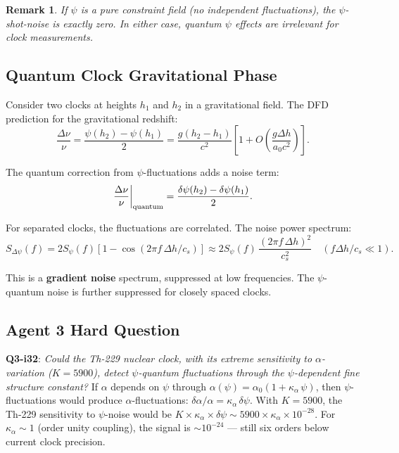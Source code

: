 \documentclass[11pt,a4paper]{article}
\newtheorem{remark}{Remark}
\begin{document}
\begin{remark}
If $\psi$ is a pure constraint field (no independent fluctuations), the $\psi$-shot-noise is exactly zero. In either case, quantum $\psi$ effects are irrelevant for clock measurements.
\end{remark}

\subsection{Quantum Clock Gravitational Phase}
\label{sec:clock-phase}

Consider two clocks at heights $h_1$ and $h_2$ in a gravitational field. The DFD prediction for the gravitational redshift:
\begin{equation}
\frac{\Delta\nu}{\nu} = \frac{\psi(h_2) - \psi(h_1)}{2} = \frac{g(h_2-h_1)}{c^2}\left[1 + O\left(\frac{g\Delta h}{a_0 c^2}\right)\right].
\end{equation}

The quantum correction from $\psi$-fluctuations adds a noise term:
\begin{equation}
\frac{\Delta\nu}{\nu}\bigg|_{\rm quantum} = \frac{\delta\psi(h_2) - \delta\psi(h_1)}{2}.
\end{equation}

For separated clocks, the fluctuations are correlated. The noise power spectrum:
\begin{equation}
S_{\Delta\psi}(f) = 2S_\psi(f)\left[1 - \cos(2\pi f\,\Delta h/c_s)\right]
\approx 2S_\psi(f)\,\frac{(2\pi f\,\Delta h)^2}{c_s^2}\quad(f\Delta h/c_s \ll 1).
\end{equation}

This is a \textbf{gradient noise} spectrum, suppressed at low frequencies. The $\psi$-quantum noise is further suppressed for closely spaced clocks.

\subsection{Agent 3 Hard Question}

\textbf{Q3-i32}: \emph{Could the Th-229 nuclear clock, with its extreme sensitivity to $\alpha$-variation ($K = 5900$), detect $\psi$-quantum fluctuations through the $\psi$-dependent fine structure constant?} If $\alpha$ depends on $\psi$ through $\alpha(\psi) = \alpha_0(1 + \kappa_\alpha\,\psi)$, then $\psi$-fluctuations would produce $\alpha$-fluctuations: $\delta\alpha/\alpha = \kappa_\alpha\,\delta\psi$. With $K = 5900$, the Th-229 sensitivity to $\psi$-noise would be $K\times\kappa_\alpha\times\delta\psi \sim 5900\times\kappa_\alpha\times 10^{-28}$. For $\kappa_\alpha \sim 1$ (order unity coupling), the signal is $\sim 10^{-24}$ --- still six orders below current clock precision.
\end{document}
